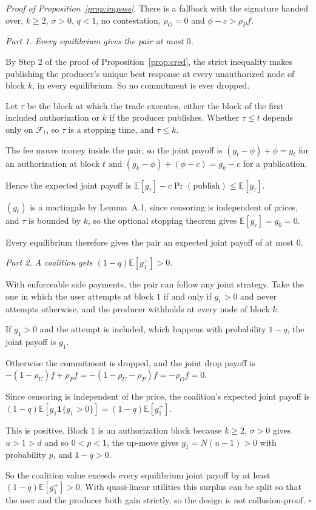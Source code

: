 \documentclass[11pt]{article}
\newcommand{\E}{\mathbb{E}}
\newenvironment{steps}{\begin{list}{}{\setlength{\leftmargin}{3.6em}\setlength{\labelwidth}{3.2em}\setlength{\labelsep}{0.4em}\setlength{\itemsep}{2pt}\setlength{\topsep}{3pt}\setlength{\parsep}{0pt}\renewcommand{\makelabel}[1]{##1\hfil}}}{\end{list}}
\begin{document}
\emph{Proof of Proposition~\ref{prop:imposs}.} There is a fallback with the signature handed over, $k\ge2$, $\sigma>0$, $q<1$, no contestation, $\rho_O=0$ and $\phi-c>\rho_P f$.

\emph{Part 1. Every equilibrium gives the pair at most $0$.}
\begin{steps}
\item[\emph{Step 1.}] By Step 2 of the proof of Proposition~\ref{prop:cred}, the strict inequality makes publishing the producer's unique best response at every unauthorized node of block $k$, in every equilibrium. So no commitment is ever dropped.
\item[\emph{Step 2.}] Let $\tau$ be the block at which the trade executes, either the block of the first included authorization or $k$ if the producer publishes. Whether $\tau\le t$ depends only on $\mathcal F_t$, so $\tau$ is a stopping time, and $\tau\le k$.
\item[\emph{Step 3.}] The fee moves money inside the pair, so the joint payoff is $(g_t-\phi)+\phi=g_t$ for an authorization at block $t$ and $(g_k-\phi)+(\phi-c)=g_k-c$ for a publication.
\item[\emph{Step 4.}] Hence the expected joint payoff is $\E[g_\tau]-c\Pr(\text{publish})\le\E[g_\tau]$.
\item[\emph{Step 5.}] $(g_t)$ is a martingale by Lemma~A.1, since censoring is independent of prices, and $\tau$ is bounded by $k$, so the optional stopping theorem gives $\E[g_\tau]=g_0=0$.
\item[\emph{Step 6.}] Every equilibrium therefore gives the pair an expected joint payoff of at most $0$.
\end{steps}
\emph{Part 2. A coalition gets $(1-q)\E[g_1^+]>0$.}
\begin{steps}
\item[\emph{Step 7.}] With enforceable side payments, the pair can follow any joint strategy. Take the one in which the user attempts at block $1$ if and only if $g_1>0$ and never attempts otherwise, and the producer withholds at every node of block $k$.
\item[\emph{Step 8.}] If $g_1>0$ and the attempt is included, which happens with probability $1-q$, the joint payoff is $g_1$.
\item[\emph{Step 9.}] Otherwise the commitment is dropped, and the joint drop payoff is $-(1-\rho_U)f+\rho_P f=-(1-\rho_U-\rho_P)f=-\rho_O f=0$.
\item[\emph{Step 10.}] Since censoring is independent of the price, the coalition's expected joint payoff is $(1-q)\E[g_1\mathbf 1\{g_1>0\}]=(1-q)\E[g_1^+]$.
\item[\emph{Step 11.}] This is positive. Block $1$ is an authorization block because $k\ge2$, $\sigma>0$ gives $u>1>d$ and so $0<p<1$, the up-move gives $g_1=N(u-1)>0$ with probability $p$, and $1-q>0$.
\item[\emph{Step 12.}] So the coalition value exceeds every equilibrium joint payoff by at least $(1-q)\E[g_1^+]>0$. With quasi-linear utilities this surplus can be split so that the user and the producer both gain strictly, so the design is not collusion-proof. \hfill$\square$
\end{steps}
\end{document}
